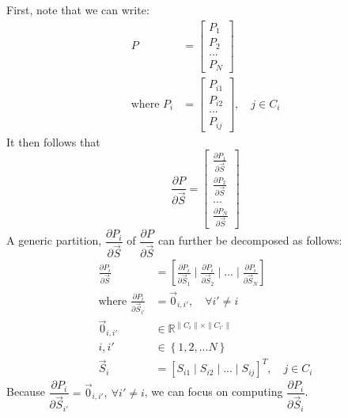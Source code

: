 \documentclass{article}
\begin{document}
First, note that we can write:
\begin{equation*}
\begin{aligned}
P &= \left[ \begin{array}{c}
P_1 \\
P_2 \\
 ... \\
 P_N 
\end{array} \right] \\
\textrm{where } P_i &= \left[ \begin{array}{c}
P_{i1} \\
P_{i2} \\
 ... \\
 P_{ij} 
\end{array} \right], \quad j \in C_i
\end{aligned}
\end{equation*}
It then follows that
\begin{equation}
\frac{\partial P}{\partial \vec{S}} = \left[ \begin{array}{c} 
\frac{\partial P_1}{\partial \vec{S}} \\[1.2ex]
\frac{\partial P_2}{\partial \vec{S}} \\
... \\
\frac{\partial P_N}{\partial \vec{S}}
\end{array} \right]
\end{equation}
A generic partition, $\dfrac{\partial P_i}{\partial \vec{S}}$ of $\dfrac{\partial P}{\partial \vec{S}}$ can further be decomposed as follows:
\begin{equation}
\begin{aligned}
\frac{\partial P_i}{\partial \vec{S}} &= \left[ \frac{\partial P_i}{\partial \vec{S}_1} \mid \frac{\partial P_i}{\partial \vec{S}_2} \mid ... \mid \frac{\partial P_i}{\partial \vec{S}_N} \right] \\
\textrm{where } \frac{\partial P_i}{\partial \vec{S}_{i'}} &= \vec{0}_{i, i'}, \quad \forall i' \neq i 
\\
\vec{0}_{i, i'} &\in \mathbb{R}^{ \parallel C_i \parallel \times \parallel C_{i'} \parallel} 
\\
i, i' &\in \left\lbrace 1, 2, ... N \right\rbrace 
\\
\vec{S}_i &= \left[ S_{i1} \mid S_{i2} \mid ... \mid S_{ij} \right]^T, \quad j \in C_i
\end{aligned}
\end{equation}
Because $\dfrac{\partial P_i}{\partial \vec{S}_{i'}} = \vec{0}_{i, i'}, \  \forall i' \neq i$, we can focus on computing $\dfrac{\partial P_i}{\partial \vec{S}_{i}}$.
\end{document}
